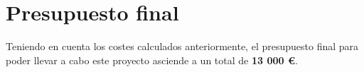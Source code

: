 
\section{Presupuesto final}

Teniendo en cuenta los costes calculados anteriormente, el presupuesto final para poder llevar a cabo este proyecto asciende a un total de \textbf{13 000 €}.